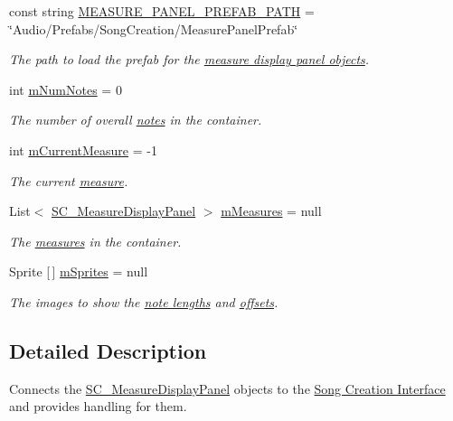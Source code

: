 \begin{DoxyCompactItemize}
\item 
const string \hyperlink{group___s_c___n_d_c_const_gabc95cd739b62996e8a19f0e9417e5f8e}{M\+E\+A\+S\+U\+R\+E\+\_\+\+P\+A\+N\+E\+L\+\_\+\+P\+R\+E\+F\+A\+B\+\_\+\+P\+A\+TH} = \char`\"{}Audio/Prefabs/Song\+Creation/Measure\+Panel\+Prefab\char`\"{}
\begin{DoxyCompactList}\small\item\em The path to load the prefab for the \hyperlink{group___doc_s_c___m_d_p}{measure display panel objects}. \end{DoxyCompactList}\item 
int \hyperlink{group___s_c___n_d_c_priv_var_gae06a4919a63806ed57b2040f41b7ca1b}{m\+Num\+Notes} = 0
\begin{DoxyCompactList}\small\item\em The number of overall \hyperlink{group___music_structs_struct_music_1_1_combined_note}{notes} in the container. \end{DoxyCompactList}\item 
int \hyperlink{group___s_c___n_d_c_priv_var_ga28ce2bf8358c9f686b5b9e362aa96dff}{m\+Current\+Measure} = -\/1
\begin{DoxyCompactList}\small\item\em The current \hyperlink{group___doc_s_c___m_d_p}{measure}. \end{DoxyCompactList}\item 
List$<$ \hyperlink{class_s_c___measure_display_panel}{S\+C\+\_\+\+Measure\+Display\+Panel} $>$ \hyperlink{group___s_c___n_d_c_priv_var_gaa072fb53f6bd6646bc85f2ebc2a02229}{m\+Measures} = null
\begin{DoxyCompactList}\small\item\em The \hyperlink{group___doc_s_c___m_d_p}{measures} in the container. \end{DoxyCompactList}\item 
Sprite \mbox{[}$\,$\mbox{]} \hyperlink{group___s_c___n_d_c_priv_var_gac8df613ee0996e999278da2b3f523e34}{m\+Sprites} = null
\begin{DoxyCompactList}\small\item\em The images to show the \hyperlink{group___music_structs_ac35cd02f5b3c00e3040b51e40e9e6c94}{note lengths} and \hyperlink{group___music_structs_ae281187907aed4c728c7981300dbebaf}{offsets}. \end{DoxyCompactList}\end{DoxyCompactItemize}


\subsection{Detailed Description}
Connects the \hyperlink{class_s_c___measure_display_panel}{S\+C\+\_\+\+Measure\+Display\+Panel} objects to the \hyperlink{group___doc_s_c}{Song Creation Interface} and provides handling for them. 

